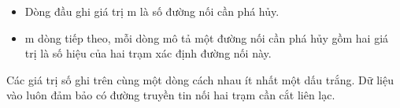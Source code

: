 \begin{itemize}
	\item     Dòng đầu ghi giá trị m là số đường nối cần phá hủy.   
	\item     m dòng tiếp theo, mỗi dòng mô tả một đường nối cần phá hủy gồm hai giá trị là số hiệu của hai trạm xác định đường nối này.   
\end{itemize}

   Các giá trị số ghi trên cùng một dòng cách nhau ít nhất một dấu trắng. Dữ liệu vào luôn đảm bảo có đường truyền tin nối hai trạm cần cắt liên lạc.